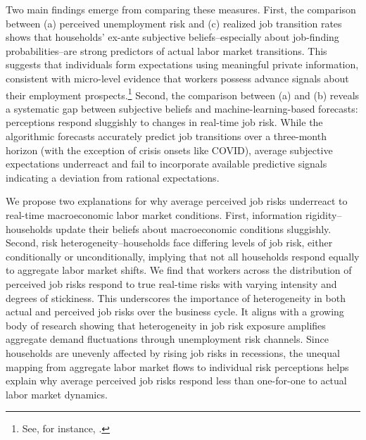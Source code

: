 Two main findings emerge from comparing these measures. First, the comparison between (a) perceived unemployment risk and (c) realized job transition rates shows that households’ ex-ante subjective beliefs--especially about job-finding probabilities--are strong predictors of actual labor market transitions. This suggests that individuals form expectations using meaningful private information, consistent with micro-level evidence that workers possess advance signals about their employment prospects.\footnote{See, for instance, \cite{hendren2017knowledge}.}
Second, the comparison between (a) and (b) reveals a systematic gap between subjective beliefs and machine-learning-based forecasts: perceptions respond sluggishly to changes in real-time job risk. While the algorithmic forecasts accurately predict job transitions over a three-month horizon (with the exception of crisis onsets like COVID), average subjective expectations underreact and fail to incorporate available predictive signals indicating a deviation from rational expectations.
         

   

We propose two explanations for why average perceived job risks underreact to real-time macroeconomic labor market conditions. First, information rigidity--households update their beliefs about macroeconomic conditions sluggishly. Second, risk heterogeneity--households face differing levels of job risk, either conditionally or unconditionally, implying that not all households respond equally to aggregate labor market shifts. We find that workers across the distribution of perceived job risks respond to true real-time risks with varying intensity and degrees of stickiness. This underscores the importance of heterogeneity in both actual and perceived job risks over the business cycle. It aligns with a growing body of research showing that heterogeneity in job risk exposure amplifies aggregate demand fluctuations through unemployment risk channels. Since households are unevenly affected by rising job risks in recessions, the unequal mapping from aggregate labor market flows to individual risk perceptions helps explain why average perceived job risks respond less than one-for-one to actual labor market dynamics.




